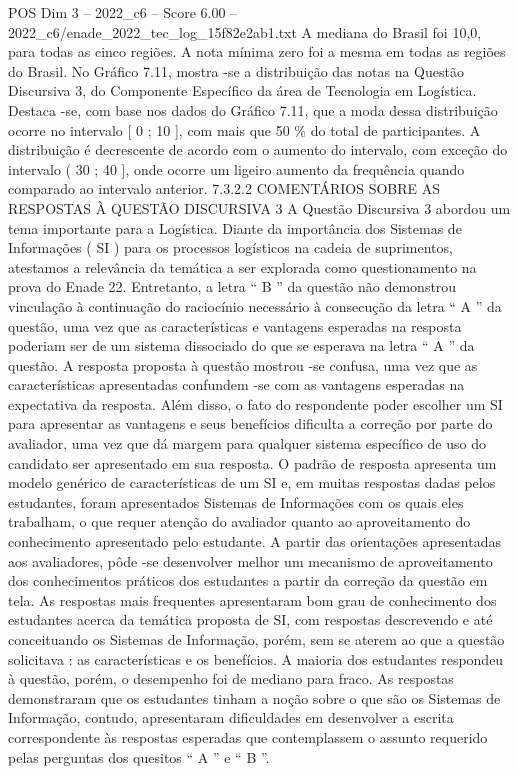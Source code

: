 \begin{textsample}{POS Dim 3 – 2022\_c6 – Score 6.00 – 2022\_c6/enade\_2022\_tec\_log\_15f82e2ab1.txt}
A mediana do Brasil foi 10,0, para todas as cinco regiões.
A nota mínima zero foi a mesma em todas as regiões do Brasil.
No Gráfico 7.11, mostra -se a distribuição das notas na Questão Discursiva 3, do Componente Específico da área de Tecnologia em Logística.
Destaca -se, com base nos dados do Gráfico 7.11, que a moda dessa distribuição ocorre no intervalo [ 0 ; 10 ], com mais que 50 \% do total de participantes.
A distribuição é decrescente de acordo com o aumento do intervalo, com exceção do intervalo ( 30 ; 40 ], onde ocorre um ligeiro aumento da frequência quando comparado ao intervalo anterior. 7.3.2.2 COMENTÁRIOS SOBRE AS RESPOSTAS À QUESTÃO DISCURSIVA 3 A Questão Discursiva 3 abordou um tema importante para a Logística.
Diante da importância dos Sistemas de Informações ( SI ) para os processos logísticos na cadeia de suprimentos, atestamos a relevância da temática a ser explorada como questionamento na prova do Enade 22.
Entretanto, a letra “ B ” da questão não demonstrou vinculação à continuação do raciocínio necessário à consecução da letra “ A ” da questão, uma vez que as características e vantagens esperadas na resposta poderiam ser de um sistema dissociado do que se esperava na letra “ A ” da questão.
A resposta proposta à questão mostrou -se confusa, uma vez que as características apresentadas confundem -se com as vantagens esperadas na expectativa da resposta.
Além disso, o fato do respondente poder escolher um SI para apresentar as vantagens e seus benefícios dificulta a correção por parte do avaliador, uma vez que dá margem para qualquer sistema específico de uso do candidato ser apresentado em sua resposta.
O padrão de resposta apresenta um modelo genérico de características de um SI e, em muitas respostas dadas pelos estudantes, foram apresentados Sistemas de Informações com os quais eles trabalham, o que requer atenção do avaliador quanto ao aproveitamento do conhecimento apresentado pelo estudante.
A partir das orientações apresentadas aos avaliadores, pôde -se desenvolver melhor um mecanismo de aproveitamento dos conhecimentos práticos dos estudantes a partir da correção da questão em tela.
As respostas mais frequentes apresentaram bom grau de conhecimento dos estudantes acerca da temática proposta de SI, com respostas descrevendo e até conceituando os Sistemas de Informação, porém, sem se aterem ao que a questão solicitava : as características e os benefícios.
A maioria dos estudantes respondeu à questão, porém, o desempenho foi de mediano para fraco.
As respostas demonstraram que os estudantes tinham a noção sobre o que são os Sistemas de Informação, contudo, apresentaram dificuldades em desenvolver a escrita correspondente às respostas esperadas que contemplassem o assunto requerido pelas perguntas dos quesitos “ A ” e “ B ”.

\end{textsample}
